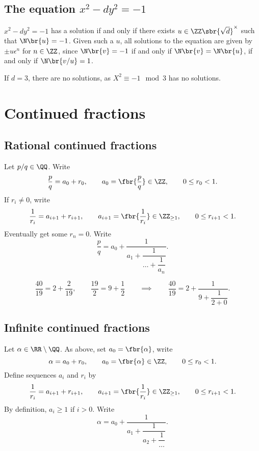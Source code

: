 \subsection{The equation \texorpdfstring{$ x^2 - dy^2 = - 1 $}{x2 - dy2 = -1}}


$ x^2 - dy^2 = -1 $ has a solution if and only if there exists $ u \in \ZZ\sbr{\sqrt{d}}^\times $ such that $ \N\br{u} = -1 $. Given such a $ u $, all solutions to the equation are given by $ \pm u\epsilon^n $ for $ n \in \ZZ $, since $ \N\br{v} = -1 $ if and only if $ \N\br{v} = \N\br{u} $, if and only if $ \N\br{v / u} = 1 $.

\begin{example*}
If $ d = 3 $, there are no solutions, as $ X^2 \equiv -1 \mod 3 $ has no solutions.
\end{example*}

\pagebreak

\section{Continued fractions}

\subsection{Rational continued fractions}

Let $ p / q \in \QQ $. Write
$$ \dfrac{p}{q} = a_0 + r_0, \qquad a_0 = \fbr{\dfrac{p}{q}} \in \ZZ, \qquad 0 \le r_0 < 1. $$
If $ r_i \ne 0 $, write
$$ \dfrac{1}{r_i} = a_{i + 1} + r_{i + 1}, \qquad a_{i + 1} = \fbr{\dfrac{1}{r_i}} \in \ZZ_{\ge 1}, \qquad 0 \le r_{i + 1} < 1. $$
Eventually get some $ r_n = 0 $. Write
$$ \dfrac{p}{q} = a_0 + \dfrac{1}{a_1 + \dfrac{1}{\dots + \dfrac{1}{a_n}}}. $$

\begin{example*}
$$ \dfrac{40}{19} = 2 + \dfrac{2}{19}, \qquad \dfrac{19}{2} = 9 + \dfrac{1}{2} \qquad \implies \qquad \dfrac{40}{19} = 2 + \dfrac{1}{9 + \dfrac{1}{2 + 0}}. $$
\end{example*}

\subsection{Infinite continued fractions}

Let $ \alpha \in \RR \setminus \QQ $. As above, set $ a_0 = \fbr{\alpha} $, write
$$ \alpha = a_0 + r_0, \qquad a_0 = \fbr{\alpha} \in \ZZ, \qquad 0 \le r_0 < 1. $$
Define sequences $ a_i $ and $ r_i $ by
$$ \dfrac{1}{r_i} = a_{i + 1} + r_{i + 1}, \qquad a_{i + 1} = \fbr{\dfrac{1}{r_i}} \in \ZZ_{\ge 1}, \qquad 0 \le r_{i + 1} < 1. $$
By definition, $ a_i \ge 1 $ if $ i > 0 $. Write
$$ \alpha = a_0 + \dfrac{1}{a_1 + \dfrac{1}{a_2 + \dfrac{1}{\dots}}}. $$

